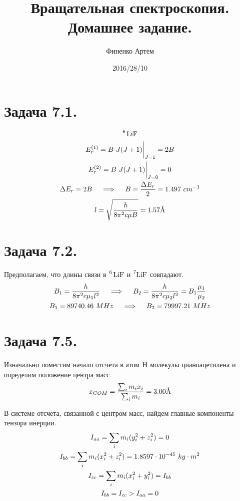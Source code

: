 \documentclass[14pt]{article}
\title{Вращательная спектроскопия. \\ Домашнее задание.}
\author{Финенко Артем}
\date{2016/28/10}
\begin{document}
\maketitle

\section*{Задача 7.1.}

\begin{gather}
\ce{{}^6 LiF} \notag \\ 
E_r^{(1)} = B \ J (J+1) \bigg{|}_{J=1} = 2B \notag \\
E_r^{(2)} = B \ J (J+1) \bigg{|}_{J=0} = 0 \notag \\
\Delta E_r = 2B \quad \implies \quad B = \frac{\Delta E_r}{2} = 1.497 \ cm^{-1} \notag \\ 
l = \sqrt{\frac{h}{8 \pi^2 c \mu B}} = 1.57 \text{\AA} \notag
\end{gather}

\section*{Задача 7.2.}
Предполагаем, что длины связи в $\ce{{}^6 LiF}$ и $\ce{{}^7LiF}$ совпадают.
\begin{gather}
B_1 = \frac{h}{8 \pi^2 c \mu_1 l^2} \quad \implies \quad B_2 = \frac{h}{8 \pi^2 c \mu_2 l^2} = B_1 \frac{\mu_1}{\mu_2} \notag \\
B_1 = 89740.46 \ MHz \quad \implies \quad B_2 = 79997.21 \ MHz \notag
\end{gather}

\section*{Задача 7.5.}
Изначально поместим начало отсчета в атом $\ce{H}$ молекулы цианоацетилена и определим положение центра масс.
\begin{gather}
x_{COM} = \frac{\sum_i m_i x_i}{\sum_i m_i} = 3.00 \text{\AA} \notag
\end{gather}

В системе отсчета, связанной с центром масс, найдем главные компоненты тензора инерции.
\begin{gather}
I_{aa} = \sum_i m_i (y_i^2 + z_i^2) = 0 \notag \\
I_{bb} = \sum_i m_i (x_i^2 + z_i^2) = 1.8597 \cdot 10^{-45} \ kg \cdot m^2 \notag \\
I_{cc} = \sum_i m_i (x_i^2 + y_i^2) = I_{bb} \notag \\
I_{bb} = I_{cc} > I_{aa} = 0 \notag
\end{gather}
\end{document}
